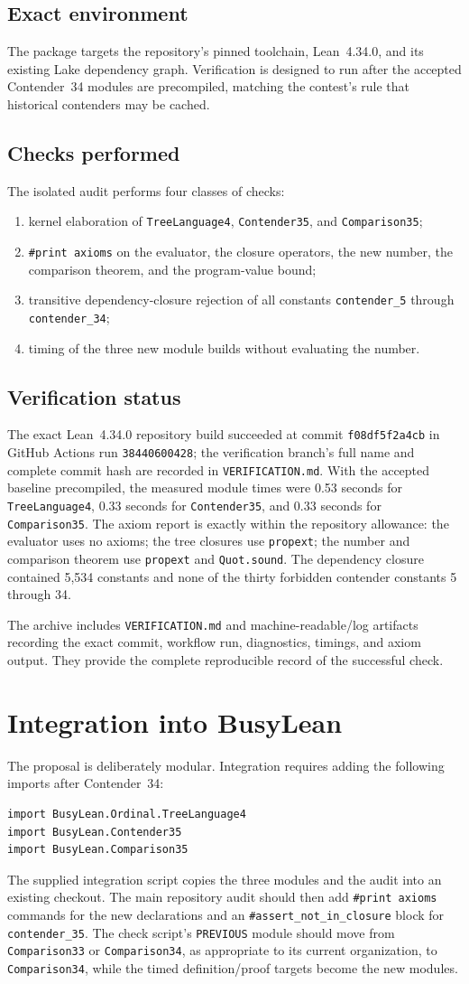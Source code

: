 \documentclass[11pt]{article}
\theoremstyle{definition}
\newcommand{\code}[1]{\texttt{#1}}
\newcommand{\StatusText}{The exact Lean~4.34.0 repository build succeeded at commit \code{f08df5f2a4cb} in GitHub Actions run \code{38440600428}; the verification branch's full name and complete commit hash are recorded in \code{VERIFICATION.md}.  With the accepted baseline precompiled, the measured module times were 0.53 seconds for \code{TreeLanguage4}, 0.33 seconds for \code{Contender35}, and 0.33 seconds for \code{Comparison35}.  The axiom report is exactly within the repository allowance: the evaluator uses no axioms; the tree closures use \code{propext}; the number and comparison theorem use \code{propext} and \code{Quot.sound}.  The dependency closure contained 5,534 constants and none of the thirty forbidden contender constants 5 through 34.}
\begin{document}
\subsection{Exact environment}

The package targets the repository's pinned toolchain, Lean~4.34.0, and its
existing Lake dependency graph.  Verification is designed to run after the
accepted Contender~34 modules are precompiled, matching the contest's rule that
historical contenders may be cached.

\subsection{Checks performed}

The isolated audit performs four classes of checks:
\begin{enumerate}[leftmargin=2.3em]
  \item kernel elaboration of \code{TreeLanguage4}, \code{Contender35}, and
  \code{Comparison35};
  \item \code{\#print axioms} on the evaluator, the closure operators, the new
  number, the comparison theorem, and the program-value bound;
  \item transitive dependency-closure rejection of all constants
  \code{contender\_5} through \code{contender\_34};
  \item timing of the three new module builds without evaluating the number.
\end{enumerate}

\subsection{Verification status}

\StatusText

The archive includes \code{VERIFICATION.md} and machine-readable/log artifacts
recording the exact commit, workflow run, diagnostics, timings, and axiom
output.  They provide the complete reproducible record of the successful check.

\section{Integration into BusyLean}

The proposal is deliberately modular.  Integration requires adding the
following imports after Contender~34:
\begin{lstlisting}
import BusyLean.Ordinal.TreeLanguage4
import BusyLean.Contender35
import BusyLean.Comparison35
\end{lstlisting}
The supplied integration script copies the three modules and the audit into an
existing checkout.  The main repository audit should then add
\code{\#print axioms} commands for the new declarations and an
\code{\#assert\_not\_in\_closure} block for \code{contender\_35}.  The check
script's \code{PREVIOUS} module should move from \code{Comparison33} or
\code{Comparison34}, as appropriate to its current organization, to
\code{Comparison34}, while the timed definition/proof targets become the new
modules.
\end{document}
